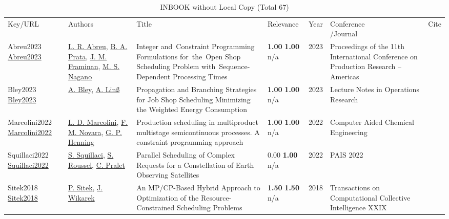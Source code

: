 {\scriptsize
\begin{longtable}{p{3cm}p{5cm}p{10cm}p{1cm}rp{2.5cm}l}
\rowcolor{white}\caption{INBOOK without Local Copy (Total 67)}\\ \toprule
\rowcolor{white}Key/URL & Authors & Title & Relevance &Year & \shortstack{Conference\\/Journal} & Cite\\ \midrule
\endhead
\bottomrule
\endfoot
Abreu2023 \href{http://dx.doi.org/10.1007/978-3-031-36121-0_9}{Abreu2023} & \hyperref[auth:a386]{L. R. Abreu}, \hyperref[auth:a385]{B. A. Prata}, \hyperref[auth:a833]{J. M. Framinan}, \hyperref[auth:a387]{M. S. Nagano} & Integer and Constraint Programming Formulations for the Open Shop Scheduling Problem with Sequence-Dependent Processing Times & \noindent{}\textbf{1.00} \textbf{1.00} n/a & 2023 & Proceedings of the 11th International Conference on Production Research – Americas & \cite{Abreu2023}\\
Bley2023 \href{http://dx.doi.org/10.1007/978-3-031-24907-5_68}{Bley2023} & \hyperref[auth:a1617]{A. Bley}, \hyperref[auth:a1618]{A. Linß} & Propagation and Branching Strategies for Job Shop Scheduling Minimizing the Weighted Energy Consumption & \noindent{}\textbf{1.00} \textbf{1.00} n/a & 2023 & Lecture Notes in Operations Research & \cite{Bley2023}\\
Marcolini2022 \href{http://dx.doi.org/10.1016/b978-0-323-85159-6.50083-x}{Marcolini2022} & \hyperref[auth:a2045]{L. D. Marcolini}, \hyperref[auth:a587]{F. M. Novara}, \hyperref[auth:a588]{G. P. Henning} & Production scheduling in multiproduct multistage semicontinuous processes. A constraint programming approach & \noindent{}\textbf{1.00} \textbf{1.00} n/a & 2022 & Computer Aided Chemical Engineering & \cite{Marcolini2022}\\
Squillaci2022 \href{http://dx.doi.org/10.3233/faia220068}{Squillaci2022} & \hyperref[auth:a20]{S. Squillaci}, \hyperref[auth:a1896]{S. Roussel}, \hyperref[auth:a1897]{C. Pralet} & \cellcolor{gold!20}Parallel Scheduling of Complex Requests for a Constellation of Earth Observing Satellites & \noindent{}\textcolor{black!50}{0.00} \textbf{1.00} n/a & 2022 & PAIS 2022 & \cite{Squillaci2022}\\
Sitek2018 \href{http://dx.doi.org/10.1007/978-3-319-90287-6_8}{Sitek2018} & \hyperref[auth:a1475]{P. Sitek}, \hyperref[auth:a1476]{J. Wikarek} & An MP/CP-Based Hybrid Approach to Optimization of the Resource-Constrained Scheduling Problems & \noindent{}\textbf{1.50} \textbf{1.50} n/a & 2018 & Transactions on Computational Collective Intelligence XXIX & \cite{Sitek2018}\\

\end{longtable}}
